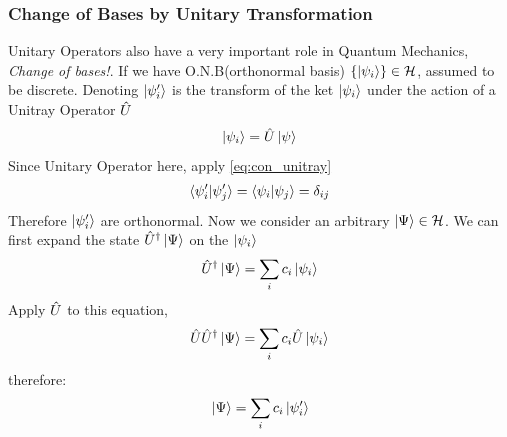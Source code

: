 \subsubsection{Change of Bases by Unitary Transformation}
Unitary Operators also have a very important role in Quantum Mechanics, \emph{Change of bases!}. If we have O.N.B(orthonormal basis) $\{\ket{\psi_i}\} \in \mathcal{H}$, assumed to be discrete. Denoting $\ket{\psi'_i}$ is the transform of the ket $\ket{\psi_i}$ under the action of a Unitray Operator $\hat{U}$
\begin{align}
    \ket{\psi_i} = \hat{U} \ket{\psi} \label{eq:unitary_psi}
\end{align}
Since Unitary Operator here, apply \cref{eq:con_unitray}
\begin{eqnarray}
    \braket{\psi'_i|\psi'_j} = \braket{\psi_i|\psi_j} = \delta_{ij}
\end{eqnarray}
Therefore $\ket{\psi'_i }$ are orthonormal. Now we consider an arbitrary $\ket{\Psi} \in \mathcal{H}$. We can first expand the state $\hat{U}^ \dag \ket{\Psi}$ on the $\ket{\psi_i}$
\begin{eqnarray}
    \hat{U}^ \dag \ket{\Psi}= \sum_i c_i \ket{\psi_i}
\end{eqnarray}
Apply $\hat{U}$ to this equation, 
\begin{eqnarray}
    \hat{U} \hat{U}^ \dag \ket{\Psi} = \sum_i c_i \hat{U} \ket{\psi_i}
\end{eqnarray}
therefore: 
\begin{eqnarray}
    \ket{\Psi} = \sum_i c_i \ket{\psi'_i}
\end{eqnarray}


